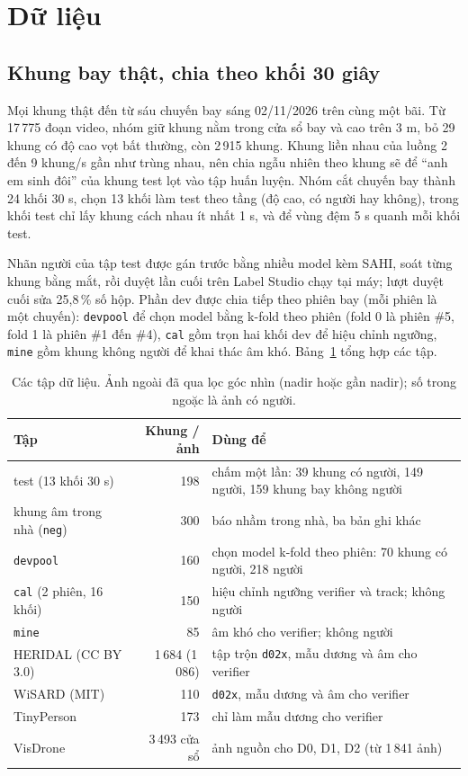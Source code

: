 \section{Dữ liệu}\label{sec:du-lieu}

\subsection{Khung bay thật, chia theo khối 30 giây}

Mọi khung thật đến từ sáu chuyến bay sáng 02/11/2026 trên cùng một bãi. Từ 17\,775 đoạn video, nhóm giữ khung nằm trong cửa sổ bay và cao trên 3 m, bỏ 29 khung có độ cao vọt bất thường, còn 2\,915 khung. Khung liền nhau của luồng 2 đến 9 khung/s gần như trùng nhau, nên chia ngẫu nhiên theo khung sẽ để ``anh em sinh đôi'' của khung test lọt vào tập huấn luyện. Nhóm cắt chuyến bay thành 24 khối 30 s, chọn 13 khối làm test theo tầng (độ cao, có người hay không), trong khối test chỉ lấy khung cách nhau ít nhất 1 s, và để vùng đệm 5 s quanh mỗi khối test.

Nhãn người của tập test được gán trước bằng nhiều model kèm SAHI, soát từng khung bằng mắt, rồi duyệt lần cuối trên Label Studio chạy tại máy; lượt duyệt cuối sửa 25,8\,\% số hộp. Phần dev được chia tiếp theo phiên bay (mỗi phiên là một chuyến): \texttt{devpool} để chọn model bằng k-fold theo phiên (fold 0 là phiên \#5, fold 1 là phiên \#1 đến \#4), \texttt{cal} gồm trọn hai khối dev để hiệu chỉnh ngưỡng, \texttt{mine} gồm khung không người để khai thác âm khó. Bảng~\ref{tab:split} tổng hợp các tập.

\begin{table}[!htbp]
\centering\footnotesize
\caption[Các tập dữ liệu]{Các tập dữ liệu. Ảnh ngoài đã qua lọc góc nhìn (nadir hoặc gần nadir); số trong ngoặc là ảnh có người.}
\label{tab:split}
\begin{tabularx}{\textwidth}{@{}l r X@{}}
\toprule
Tập & Khung / ảnh & Dùng để \\
\midrule
test (13 khối 30 s) & 198 & chấm một lần: 39 khung có người, 149 người, 159 khung bay không người \\
khung âm trong nhà (\texttt{neg}) & 300 & báo nhầm trong nhà, ba bản ghi khác \\
\texttt{devpool} & 160 & chọn model k-fold theo phiên: 70 khung có người, 218 người \\
\texttt{cal} (2 phiên, 16 khối) & 150 & hiệu chỉnh ngưỡng verifier và track; không người \\
\texttt{mine} & 85 & âm khó cho verifier; không người \\
\addlinespace
HERIDAL (CC BY 3.0) & 1\,684 (1\,086) & tập trộn \texttt{d02x}, mẫu dương và âm cho verifier \\
WiSARD (MIT) & 110 & \texttt{d02x}, mẫu dương và âm cho verifier \\
TinyPerson & 173 & chỉ làm mẫu dương cho verifier \\
VisDrone & 3\,493 cửa sổ & ảnh nguồn cho D0, D1, D2 (từ 1\,841 ảnh) \\
\bottomrule
\end{tabularx}
\end{table}

